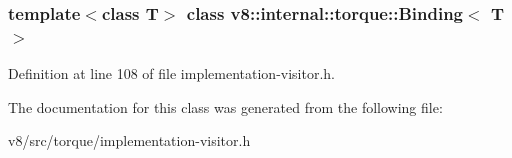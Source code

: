 \subsubsection*{template$<$class T$>$\newline
class v8\+::internal\+::torque\+::\+Binding$<$ T $>$}



Definition at line 108 of file implementation-\/visitor.\+h.



The documentation for this class was generated from the following file\+:\begin{DoxyCompactItemize}
\item 
v8/src/torque/implementation-\/visitor.\+h\end{DoxyCompactItemize}
